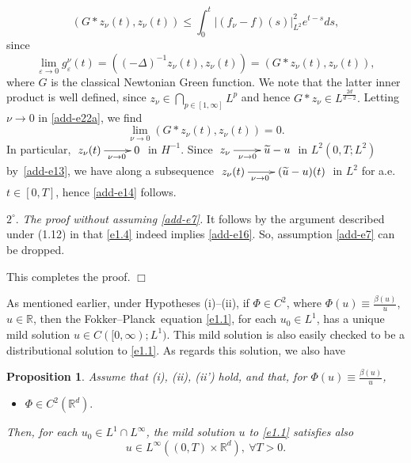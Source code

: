\documentclass[12pt]{article}
\def\xym{\xymatrix}
\def\rrd{{\rr^d}}
\def\bk{\bigskip }
\def\n{\noindent }
\def\dd{\displaystyle}
\def\FP{Fokker--Planck}
\newtheorem{proposition}[theorem]{Proposition}
\theoremstyle{definition}
\def\rr{{\mathbb{R}}}
\def\9{{\infty}}
\def\wt{\widetilde}
\def\vp{{\varepsilon}}
\def\dd{\displaystyle}
\def\bk{\bigskip }
\def\n{\noindent }
\def\ff{\forall }
\begin{document}
 \begin{equation}
	\label{add-e22a}
	(G*z_\nu(t),z_\nu(t))\le\int^t_0|(f_\nu-f)(s)|^2_{L^2}e^{t-s}ds,\end{equation}
since $$\lim_{\vp\to0}g^\nu_\vp(t)=((-\Delta)^{-1}z_\nu(t),z_\nu(t))=(G*z_\nu(t),z_\nu(t)),$$where $G$ is the classical Newtonian Green function. We note that the  latter  inner product is well defined, since $z_\nu\in\dd\bigcap_{p\in[1,\9]}L^p$ and hence $G*z_\nu\in L^{\frac{2d}{d-2}}.$ Letting $\nu\to0$ in \eqref{add-e22a}, we find
$$\lim_{\nu\to0}(G*z_\nu(t),z_\nu(t))=0.$$
In particular, $\xym{z_\nu(t)\ar[r]_{\ \ \nu\to0}&0}$ in $H^{-1}$. Since $\xym{z_\nu\ar[r]_{\nu\to0\ \ }&\wt u-u}$ in $L^2(0,T;L^2)$ by~\eqref{add-e13}, we have along a subsequence $\xym{z_\nu(t)\ar[r]_{\nu\to0\ \ \ \ }&(\wt u-u)(t)}$ in $L^2$ for a.e. $t\in[0,T]$, hence \eqref{add-e14} follows.

\bk\n$2^\circ$. {\it The proof without assuming  \eqref{add-e7}.} It follows by the argument described under (1.12)  in \cite{3} that \eqref{e1.4} indeed implies \eqref{add-e16}. So, assumption \eqref{add-e7} can be dropped.

This completes the proof.
\hfill$\Box$\bk 

\n As mentioned earlier, under Hypotheses (i)--(ii), if $\Phi\in C^2$, where $\Phi(u)\equiv\frac{\beta(u)}u$, $u\in\rr$, then the \FP\ equation \eqref{e1.1}, for each $u_0\in L^1$, has a unique mild solution $u\in C([0,\9);L^1).$ This mild solution is also easily checked to be a distributional solution to \eqref{e1.1}. As regards this solution, we also have


\begin {proposition}\label{p2} Assume that {\rm (i), (ii), (ii')} hold, and that, for $\Phi(u)\equiv\frac{\beta(u)}u$,
\begin{itemize}
	\item[{\rm(iii)}] $\Phi\in C^2(\rrd).$
	\end{itemize}
	 Then, for each $u_0\in L^1\cap L^\9$, the mild solution $u$ to \eqref{e1.1} satisfies also
\begin{equation}
 \label{e2.8}
u\in L^\9((0,T)\times\rrd),\ \ff T>0.
\end{equation}
\end{proposition}
\end{document}
